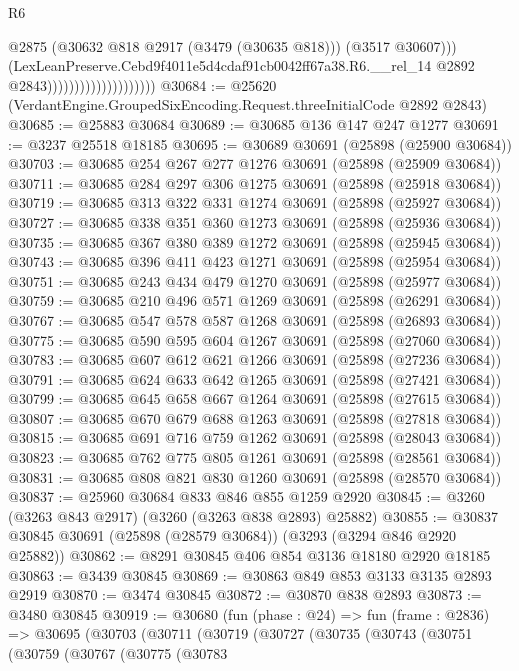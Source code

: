 \begin{lexlean}{R6}
\begin{coremodule}
                                              @2875
                                              (@30632 @818 @2917 (@3479 (@30635 @818)))
                                              (@3517 @30607)))
                                          (LexLeanPreserve.Cebd9f4011e5d4cdaf91cb0042ff67a38.R6.__rel_14
                                            @2892
                                            @2843))))))))))))))))))))
@30684 := @25620 (VerdantEngine.GroupedSixEncoding.Request.threeInitialCode @2892 @2843)
@30685 := @25883 @30684
@30689 := @30685 @136 @147 @247 @1277
@30691 := @3237 @25518 @18185
@30695 := @30689 @30691 (@25898 (@25900 @30684))
@30703 := @30685 @254 @267 @277 @1276 @30691 (@25898 (@25909 @30684))
@30711 := @30685 @284 @297 @306 @1275 @30691 (@25898 (@25918 @30684))
@30719 := @30685 @313 @322 @331 @1274 @30691 (@25898 (@25927 @30684))
@30727 := @30685 @338 @351 @360 @1273 @30691 (@25898 (@25936 @30684))
@30735 := @30685 @367 @380 @389 @1272 @30691 (@25898 (@25945 @30684))
@30743 := @30685 @396 @411 @423 @1271 @30691 (@25898 (@25954 @30684))
@30751 := @30685 @243 @434 @479 @1270 @30691 (@25898 (@25977 @30684))
@30759 := @30685 @210 @496 @571 @1269 @30691 (@25898 (@26291 @30684))
@30767 := @30685 @547 @578 @587 @1268 @30691 (@25898 (@26893 @30684))
@30775 := @30685 @590 @595 @604 @1267 @30691 (@25898 (@27060 @30684))
@30783 := @30685 @607 @612 @621 @1266 @30691 (@25898 (@27236 @30684))
@30791 := @30685 @624 @633 @642 @1265 @30691 (@25898 (@27421 @30684))
@30799 := @30685 @645 @658 @667 @1264 @30691 (@25898 (@27615 @30684))
@30807 := @30685 @670 @679 @688 @1263 @30691 (@25898 (@27818 @30684))
@30815 := @30685 @691 @716 @759 @1262 @30691 (@25898 (@28043 @30684))
@30823 := @30685 @762 @775 @805 @1261 @30691 (@25898 (@28561 @30684))
@30831 := @30685 @808 @821 @830 @1260 @30691 (@25898 (@28570 @30684))
@30837 := @25960 @30684 @833 @846 @855 @1259 @2920
@30845 := @3260 (@3263 @843 @2917) (@3260 (@3263 @838 @2893) @25882)
@30855 := @30837 @30845 @30691 (@25898 (@28579 @30684)) (@3293 (@3294 @846 @2920 @25882))
@30862 := @8291 @30845 @406 @854 @3136 @18180 @2920 @18185
@30863 := @3439 @30845
@30869 := @30863 @849 @853 @3133 @3135 @2893 @2919
@30870 := @3474 @30845
@30872 := @30870 @838 @2893
@30873 := @3480 @30845
@30919 := @30680
    (fun (phase : @24) =>
    fun (frame : @2836) =>
    @30695
      (@30703
        (@30711
          (@30719
            (@30727
              (@30735
                (@30743
                  (@30751
                    (@30759
                      (@30767
                        (@30775
                          (@30783

\end{coremodule}
\end{lexlean}
